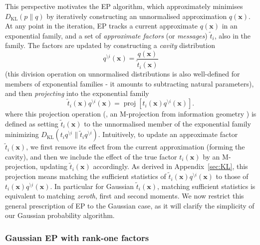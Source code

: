 \documentclass[twoside,11pt]{article}
\def\x{{\mathbf x}}
\newcommand{\KL}{\text{KL}}
\newcommand{\wo}{\setminus}
\begin{document}
This perspective motivates the EP algorithm, which approximately
minimises $D_\KL(p \| q)$ by iteratively constructing an unnormalised approximation
$q(\x)$. At any point in the
iteration, EP tracks a current approximate $q(\x)$ in an
exponential family, and a set of \emph{approximate factors} (or \emph{messages}) $\tilde{t}_i$, also
in the family. The factors are updated by constructing a
\emph{cavity} distribution
%
\begin{equation}
  \label{eq:5}
  q^{\wo i}(\x) = \frac{q(\x)}{\tilde{t}_i(\x)}
\end{equation}
%
(this division operation on unnormalised distributions is also well-defined for members
of exponential families - it amounts to subtracting natural parameters), and then
\emph{projecting} into the exponential family
%
\begin{equation}
  \label{eq:6}
  \tilde{t}_i(\x)q^{\wo i}(\x) = \operatorname{proj} [t_i(\x)q^{\wo i}(\x)].
\end{equation}
%
where this projection operation (\cite{PowerEP}, an M-projection from information geometry \cite[]{kollerBook}) is defined as setting $\tilde{t}_i(\x)$ to the unnormalised member of the exponential family minimizing $D_\KL(t_i q^{\wo i}\| \tilde{t}_i q^{\wo i})$.   Intuitively, to update an approximate factor $\tilde{t}_i(\x)$, we first remove its effect from the current approximation (forming the cavity), and then we include the effect of the true factor $t_i(\x)$ by an M-projection, updating $\tilde{t}_i(\x)$ accordingly.  As derived in Appendix~\ref{sec:KL}, this projection means matching the sufficient statistics of $\tilde{t}_i(\x)q^{\wo i}(\x)$ to those of $t_i(\x) q^{\wo i}(\x)$. In particular for Gaussian $\tilde{t}_i(\x)$, matching sufficient statistics is equivalent to matching \emph{zeroth}, first and second moments.   We now restrict this general prescription of EP to the Gaussian case, as it will clarify the simplicity of our Gaussian probability algorithm.

\subsubsection{Gaussian EP with rank-one factors}
\label{sec:gaussian-ep}
\end{document}
